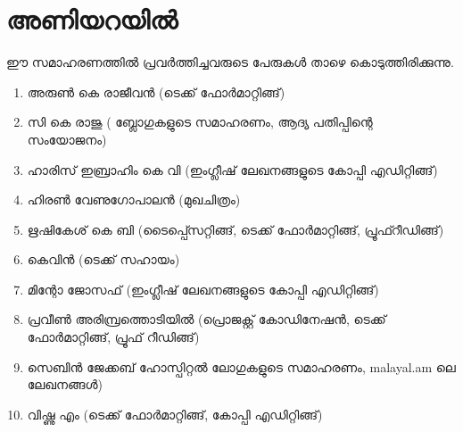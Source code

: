 \section*{അണിയറയില്‍}

ഈ സമാഹരണത്തില്‍ പ്രവര്‍ത്തിച്ചവരുടെ പേരുകള്‍ താഴെ കൊടുത്തിരിക്കുന്നു. 

\begin{enumerate}
 \item അരുണ്‍ കെ രാജീവന്‍ (ടെക്ക് ഫോര്‍മാറ്റിങ്ങ്)
 \item സി കെ രാജു ( ബ്ലോഗുകളുടെ സമാഹരണം, ആദ്യ പതിപ്പിന്റെ സംയോജനം)
 \item ഹാരിസ് ഇബ്രാഹിം  കെ വി  (ഇംഗ്ലീഷ് ലേഖനങ്ങളുടെ കോപ്പി എഡിറ്റിങ്ങ്)
 \item ഹിരണ്‍ വേണുഗോപാലന്‍ (മുഖചിത്രം)
 \item ഋഷികേശ് കെ ബി (ടൈപ്പ്സെറ്റിങ്ങ്, ടെക്ക് ഫോര്‍മാറ്റിങ്ങ്, പ്രൂഫ്റീഡിങ്ങ്) 
 \item കെവിന്‍ (ടെക്ക് സഹായം)
 \item മിന്റോ ജോസഫ് (ഇംഗ്ലീഷ് ലേഖനങ്ങളുടെ കോപ്പി എഡിറ്റിങ്ങ്)
 \item പ്ര‌‌വീണ്‍ അരിമ്പ്രത്തൊടിയില്‍ (പ്രൊജക്റ്റ് കോഡിനേഷന്‍, ടെക്ക് ഫോര്‍മാറ്റിങ്ങ്, പ്രൂഫ് റീഡിങ്ങ്)
 \item സെബിന്‍ ജേക്കബ് ഹോസ്പിറ്റല്‍ ലോഗുകളുടെ സമാഹരണം, malayal.am ലെ ലേഖനങ്ങള്‍)
 \item വിഷ്ണു എം (ടെക്ക് ഫോര്‍മാറ്റിങ്ങ്, കോപ്പി എഡിറ്റിങ്ങ്)
\end{enumerate}

\newpage

